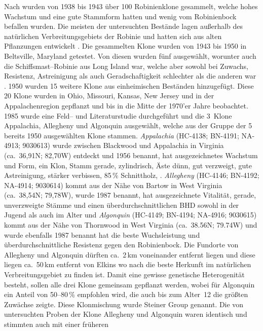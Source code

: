 \documentclass[twocolumn]{scrartcl}
\begin{document}
Nach \cite{steinergroup1987robinie} wurden von 1938 bis 1943 über 100
Robinienklone gesammelt, welche hohes Wachstum und eine gute Stammform
hatten und wenig vom Robinienbock befallen wurden. Die meisten der
untersuchten Bestände lagen außerhalb des natürlichen
Verbreitungsgebiets der Robinie und hatten sich aus alten Pflanzungen
entwickelt \citep{hopp1941robinie}. Die gesammelten Klone wurden von
1943 bis 1950 in Beltsville, Maryland getestet. Von diesen wurden fünf
ausgewählt, worunter auch die Schiffsmast--Robinie aus Long Island
war, welche aber sowohl bei Zuwachs, Resistenz, Astreinigung als auch
Geradschaftigkeit schlechter als die anderen war
\citep{santamour1960robinie}. 1950 wurden 15 weitere Klone aus
einheimischen Beständen hinzugefügt. Diese 20 Klone wurden in Ohio,
Missouri, Kansas, New Jersey und in der Appalachenregion gepflanzt und
bis in die Mitte der 1970'er Jahre beobachtet. 1985 wurde eine Feld--
und Literaturstudie durchgeführt und die 3~Klone Appalachia, Allegheny
und Algonquin ausgewählt, welche aus der Gruppe der 5 bereits 1950
ausgewählten Klone stammen. \emph{Appalachia} (HC-4138; BN-4191;
NA-4913; 9030613) wurde zwischen Blackwood und Appalachia in Virginia
(ca.~36,91N; 82,70W) entdeckt und 1956 benannt, hat ausgezeichnetes
Wachstum und Form, ein Klon, Stamm gerade, zylindrisch, Äste dünn, gut
verzweigt, gute Astreinigung, stärker verbissen, 85\,\% Schnittholz,
\citep{zsombor1980robinie,kapusi1995robinie}. \emph{Allegheny}
(HC-4146; BN-4192; NA-4914; 9030614) kommt aus der Nähe von Bartow in
West Virginia (ca.~38,54N; 79,78W), wurde 1987 benannt, hat
ausgezeichnete Vitalität, gerade, unverzweigte Stämme und einen
überdurchschnittlichen BHD sowohl in der Jugend als auch im Alter und
\emph{Algonquin} (HC-4149; BN-4194; NA-4916; 9030615) kommt aus der
Nähe von Thornwood in West Virginia (ca.~38.56N; 79.74W) und wurde
ebenfalls 1987 benannt hat die beste Wuchsleistung und
überdurchschnittliche Resistenz gegen den Robinienbock. Die Fundorte
von Allegheny und Algonquin dürften ca.\ 2\,km voneinander entfernt
liegen und diese liegen ca.\ 50\,km entfernt von Elkins wo nach
\cite{hopp1941robinie} die beste Herkunft im natürlichen
Verbreitungsgebiet zu finden ist.  Damit eine gewisse genetische
Heterogenität besteht, sollen alle drei Klone gemeinsam gepflanzt
werden, wobei für Algonquin ein Anteil von 50--80\,\% empfohlen wird,
die auch bis zum Alter~12 die größten Zuwächse zeigte. Diese
Klonmischung wurde Steiner Group genannt. Die von
\cite{liesebach2012robinie} untersuchten Proben der Klone Allegheny
und Algonquin waren identisch und stimmten auch mit einer früheren
\end{document}
